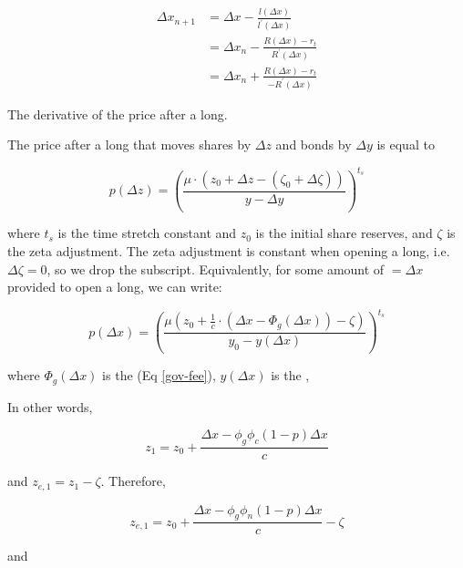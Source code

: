 \begin{equation}
\begin{aligned}
\Delta x_{n+1} &= \Delta x - \frac{l(\Delta x)}{l^{\prime}(\Delta x)} \\
&= \Delta x_{n} - \frac{R(\Delta x) - r_{t}}{R^{\prime}(\Delta x)} \\
&= \Delta x_{n} + \frac{R(\Delta x) - r_{t}}{-R^{\prime}(\Delta x)}
\end{aligned}
\end{equation}

\pagebreak 

The derivative of the price after a long.

The price after a long that moves shares by $\Delta z$ and bonds by $\Delta y$
is equal to

\begin{equation}
p(\Delta z) = \left( \frac{\mu \cdot
    (z_{0} + \Delta z - (\zeta_{0} + \Delta \zeta))}
    {y - \Delta y} \right)^{t_{s}}
\end{equation}

where $t_{s}$ is the time stretch constant and $z_{0}$ is the initial
share reserves, and $\zeta$ is the zeta adjustment.
The zeta adjustment is constant when opening a long, i.e.
$\Delta \zeta = 0$, so we drop the subscript. Equivalently, for some
amount of $= \Delta x$ provided to open a long, we can write:

\begin{equation}
p(\Delta x) = \left(
    \frac{\mu (z_{0} + \frac{1}{c}
    \cdot \left( \Delta x - \Phi_{g}(\Delta x) \right) - \zeta)}
    {y_0 - y(\Delta x)}
\right)^{t_{s}}
\end{equation}

where $\Phi_{g}(\Delta x)$ is the  (Eq \eqref{gov-fee}),
$y(\Delta x)$ is the ,

In other words,

\begin{equation}
z_1 = z_0 + \frac{
    \Delta x - \phi_g \phi_c \left( 1 - p \right) \Delta x
}{c}
\end{equation}

and $z_{e,1} = z_{1} - \zeta$. Therefore,

\begin{equation}
z_{e,1} = z_0 + \frac{
    \Delta x - \phi_g \phi_n \left( 1 - p \right) \Delta x
}{c} - \zeta
\end{equation}

and

